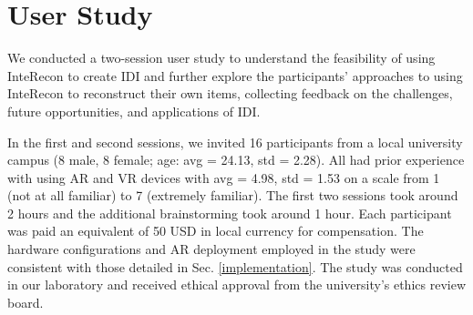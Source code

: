 \section{User Study}
We conducted a two-session user study to understand the feasibility of using InteRecon to create IDI and further explore the participants' approaches to using InteRecon to reconstruct their own items, collecting feedback on the challenges, future opportunities, and applications of IDI. 

In the first and second sessions, we invited 16 participants from a local university campus (8 male, 8 female; age: avg = 24.13, std = 2.28). 
All had prior experience with using AR and VR devices with avg = 4.98, std = 1.53 on a scale from 1 (not at all familiar) to 7 (extremely familiar). 
The first two sessions took around 2 hours and the additional brainstorming took around 1 hour.
Each participant was paid an equivalent of 50 USD in local currency for compensation. 
The hardware configurations and AR deployment employed in the study were consistent with those detailed in Sec. \ref{implementation}.
The study was conducted in our laboratory and received ethical approval from the university's ethics review board.





